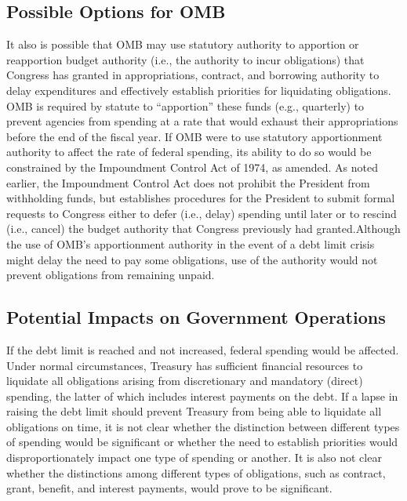 \subsection{Possible Options for OMB}
It also is possible that OMB may use statutory authority to apportion or reapportion budget authority (i.e., the authority to incur obligations) that Congress has granted in appropriations, contract, and borrowing authority to delay expenditures and effectively establish priorities for liquidating obligations. OMB is required by statute to “apportion” these funds (e.g., quarterly) to prevent agencies from spending at a rate that would exhaust their appropriations before the end of the fiscal year. If OMB were to use statutory apportionment authority to affect the rate of federal spending, its ability to do so would be constrained by the Impoundment Control Act of 1974, as amended. As noted earlier, the Impoundment Control Act does not prohibit the President from withholding funds, but establishes procedures for the President to submit formal requests to Congress either to defer (i.e., delay) spending until later or to rescind (i.e., cancel) the budget authority that Congress previously had granted.Although the use of OMB’s apportionment authority in the event of a debt limit crisis might delay the need to pay some obligations, use of the authority would not prevent obligations from remaining unpaid.

\subsection{Potential Impacts on Government Operations}
If the debt limit is reached and not increased, federal spending would be affected. Under normal circumstances, Treasury has sufficient financial resources to liquidate all obligations arising from discretionary and mandatory (direct) spending, the latter of which includes interest payments on the debt. If a lapse in raising the debt limit should prevent Treasury from being able to liquidate all obligations on time, it is not clear whether the distinction between different types of spending would be significant or whether the need to establish priorities would disproportionately impact one type of spending or another. It is also not clear whether the distinctions among different types of obligations, such as contract, grant, benefit, and interest payments, would prove to be significant.


